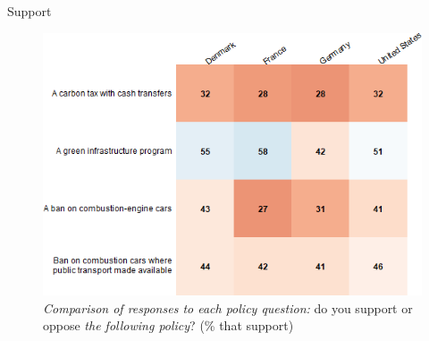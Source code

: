\documentclass[aspectratio=169,9pt,dvipsnames]{beamer}
\begin{document}
\begin{frame}{Support}%
\begin{figure}[h!]
\vspace{-.1cm}
\centering
\caption{\textit{Comparison of responses to each policy question:} do you support or oppose \textit{the following policy}? (\% that support)}
\includegraphics[width=.6\textwidth]{../figures/country_comparison/policies_all_support_positive_countries.png}
\end{figure}
\end{frame}


\end{document}
